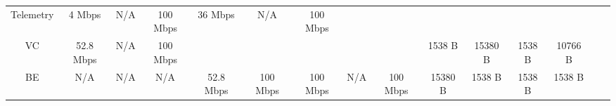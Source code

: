 \begin{table*}
{\begin{tabular}{cclccclccccccccll}
\multicolumn{1}{|c|}{\cellcolor[HTML]{FFFFFF}Telemetry}                                & \multicolumn{2}{c|}{\cellcolor[HTML]{FFFFFF}4 Mbps}                 & \multicolumn{1}{c|}{\cellcolor[HTML]{FFFFFF}N/A}           & \multicolumn{1}{c|}{\cellcolor[HTML]{FFFFFF}100 Mbps}          & \multicolumn{2}{c|}{\multirow{-2}{*}{\cellcolor[HTML]{FFFFFF}36 Mbps}}   & \multicolumn{1}{c|}{\multirow{-2}{*}{\cellcolor[HTML]{FFFFFF}N/A}}      & \multicolumn{1}{c|}{\multirow{-2}{*}{\cellcolor[HTML]{FFFFFF}100 Mbps}} & \multicolumn{1}{c|}{\cellcolor[HTML]{FFFFFF}}                      & \multicolumn{1}{c|}{\cellcolor[HTML]{FFFFFF}}                           & \multicolumn{1}{c|}{\cellcolor[HTML]{FFFFFF}}                        & \multicolumn{1}{c|}{\cellcolor[HTML]{FFFFFF}}                         & \multicolumn{1}{c|}{\cellcolor[HTML]{FFFFFF}}                        & \multicolumn{1}{c|}{\cellcolor[HTML]{FFFFFF}}                         &  &  \\ \cline{1-9}
\multicolumn{1}{|c|}{\cellcolor[HTML]{FFFFFF}VC}                                       & \multicolumn{2}{c|}{\cellcolor[HTML]{FFFFFF}52.8 Mbps}              & \multicolumn{1}{c|}{\cellcolor[HTML]{FFFFFF}N/A}           & \multicolumn{1}{c|}{\cellcolor[HTML]{FFFFFF}100 Mbps}          & \multicolumn{2}{c|}{\cellcolor[HTML]{FFFFFF}}                            & \multicolumn{1}{c|}{\cellcolor[HTML]{FFFFFF}}                           & \multicolumn{1}{c|}{\cellcolor[HTML]{FFFFFF}}                           & \multicolumn{1}{c|}{\cellcolor[HTML]{FFFFFF}}                      & \multicolumn{1}{c|}{\cellcolor[HTML]{FFFFFF}}                           & \multicolumn{1}{c|}{\multirow{-2}{*}{\cellcolor[HTML]{FFFFFF}1538 B}} & \multicolumn{1}{c|}{\multirow{-2}{*}{\cellcolor[HTML]{FFFFFF}15380 B}} & \multicolumn{1}{c|}{\multirow{-2}{*}{\cellcolor[HTML]{FFFFFF}1538 B}} & \multicolumn{1}{c|}{\multirow{-2}{*}{\cellcolor[HTML]{FFFFFF}10766 B}} &  &  \\ \cline{1-5} \cline{12-15}
\multicolumn{1}{|c|}{\cellcolor[HTML]{FFFFFF}BE}                                       & \multicolumn{2}{c|}{\cellcolor[HTML]{FFFFFF}N/A}                    & \multicolumn{1}{c|}{\cellcolor[HTML]{FFFFFF}N/A}           & \multicolumn{1}{c|}{\cellcolor[HTML]{FFFFFF}N/A}               & \multicolumn{2}{c|}{\multirow{-2}{*}{\cellcolor[HTML]{FFFFFF}52.8 Mbps}} & \multicolumn{1}{c|}{\multirow{-2}{*}{\cellcolor[HTML]{FFFFFF}100 Mbps}} & \multicolumn{1}{c|}{\multirow{-2}{*}{\cellcolor[HTML]{FFFFFF}100 Mbps}} & \multicolumn{1}{c|}{\multirow{-5}{*}{\cellcolor[HTML]{FFFFFF}N/A}} & \multicolumn{1}{c|}{\multirow{-5}{*}{\cellcolor[HTML]{FFFFFF}100 Mbps}} & \multicolumn{1}{c|}{\cellcolor[HTML]{FFFFFF}15380 B}                  & \multicolumn{1}{c|}{\cellcolor[HTML]{FFFFFF}1538 B}                    & \multicolumn{1}{c|}{\cellcolor[HTML]{FFFFFF}1538 B}                   & \multicolumn{1}{c|}{\cellcolor[HTML]{FFFFFF}1538 B}                    &  &  \\ \cline{1-15}

\end{tabular}}
\end{table*}
